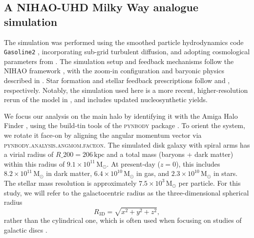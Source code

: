 \documentclass[fleqn,usenatbib]{mnras}
\begin{document}
\subsection{A NIHAO-UHD Milky Way analogue simulation} \label{sec:data_simulation}

The simulation was performed using the smoothed particle hydrodynamics code \texttt{Gasoline2} \citep{Wadsley2017}, incorporating sub-grid turbulent diffusion, and adopting cosmological parameters from \citet{Planck2014}. The simulation setup and feedback mechanisms follow the NIHAO framework \citep{Wang2015}, with the zoom-in configuration and baryonic physics described in \citet{Buck2021}. Star formation and stellar feedback prescriptions follow \citet{Stinson2006} and \citet{Stinson2013}, respectively. Notably, the simulation used here is a more recent, higher-resolution rerun of the model in \citet{Buder2024}, and includes updated nucleosynthetic yields.

We focus our analysis on the main halo by identifying it with the Amiga Halo Finder \citep{Knollman2009}, using the build-tin tools of the \textsc{pynbody} package \citep{pynbody}. To orient the system, we rotate it face-on by aligning the angular momentum vector via \textsc{pynbody.analysis.angmom.faceon}. The simulated disk galaxy with spiral arms has a virial radius of $R\_{200} = 206\,\mathrm{kpc}$ and a total mass (baryons + dark matter) within this radius of $9.1 \times 10^{11}\,\mathrm{M_\odot}$. At present-day ($z = 0$), this includes $8.2 \times 10^{11}\,\mathrm{M_\odot}$ in dark matter, $6.4 \times 10^{10}\,\mathrm{M_\odot}$ in gas, and $2.3 \times 10^{10}\,\mathrm{M_\odot}$ in stars. The stellar mass resolution is approximately $7.5 \times 10^3\,\mathrm{M_{\odot}}$ per particle. For this study, we will refer to the galactocentric radius as the three-dimensional spherical radius
\begin{equation}
    R_{\mathrm{3D}} = \sqrt{x^2 + y^2 + z^2},
\end{equation}
rather than the cylindrical one, which is often used when focusing on studies of galactic discs \citep[for example by][for the same simulation]{Buder2025}.
\end{document}
